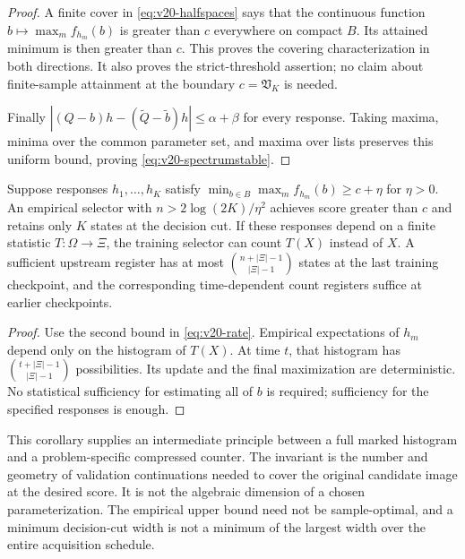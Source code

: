 \begin{proof}
A finite cover in \eqref{eq:v20-halfspaces} says that the continuous
function $b\mapsto\max_m f_{h_m}(b)$ is greater than $c$ everywhere on
compact $B$. Its attained minimum is then greater than $c$. This proves
the covering characterization in both directions. It also proves the
strict-threshold assertion; no claim about finite-sample attainment at
the boundary $c=\mathfrak V_K$ is needed.

Finally $|(Q-b)h-(\widetilde Q-\widetilde b)h|\le\alpha+\beta$
for every response. Taking maxima, minima over the common parameter set,
and maxima over lists preserves this uniform bound, proving
\eqref{eq:v20-spectrumstable}.
\end{proof}

\begin{corollary}
\label{cor:v20-dictionary}
Suppose responses $h_1,\ldots,h_K$ satisfy
$\min_{b\in B}\max_m f_{h_m}(b)\ge c+\eta$ for $\eta>0$.
An empirical selector with $n>2\log(2K)/\eta^2$ achieves score greater
than $c$ and retains only $K$ states at the decision cut. If these
responses depend on a finite statistic $T:\Omega\to\Xi$, the training
selector can count $T(X)$ instead of $X$. A sufficient upstream register
has at most $\binom{n+|\Xi|-1}{|\Xi|-1}$ states at the last training
checkpoint, and the corresponding time-dependent count registers suffice
at earlier checkpoints.
\end{corollary}
\begin{proof}
Use the second bound in \eqref{eq:v20-rate}. Empirical expectations of
$h_m$ depend only on the histogram of $T(X)$. At time $t$, that histogram
has $\binom{t+|\Xi|-1}{|\Xi|-1}$ possibilities. Its update and the final
maximization are deterministic. No statistical sufficiency for estimating
all of $b$ is required; sufficiency for the specified responses is enough.
\end{proof}

This corollary supplies an intermediate principle between a full marked
histogram and a problem-specific compressed counter. The invariant is the
number and geometry of validation continuations needed to cover the
original candidate image at the desired score. It is not the algebraic
dimension of a chosen parameterization. The empirical upper bound need
not be sample-optimal, and a minimum decision-cut width is not a minimum
of the largest width over the entire acquisition schedule.

